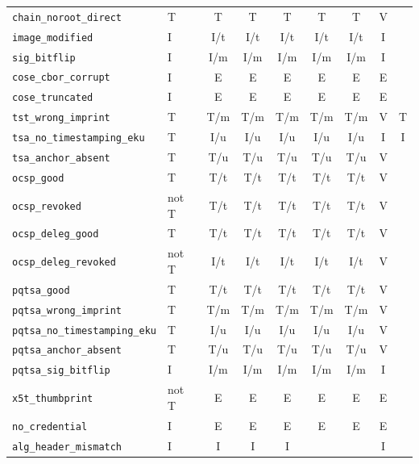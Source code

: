 {\begin{longtable}{>{\raggedright\arraybackslash}p{4.2cm}p{1.2cm}ccccccc}
\texttt{chain\_\allowbreak{}noroot\_\allowbreak{}direct} & T & T & T & T & T & T & V & \\
\texttt{image\_\allowbreak{}modified} & I & I/t & I/t & I/t & I/t & I/t & I & \\
\texttt{sig\_\allowbreak{}bitflip} & I & I/m & I/m & I/m & I/m & I/m & I & \\
\texttt{cose\_\allowbreak{}cbor\_\allowbreak{}corrupt} & I & E & E & E & E & E & E & \\
\texttt{cose\_\allowbreak{}truncated} & I & E & E & E & E & E & E & \\
\texttt{tst\_\allowbreak{}wrong\_\allowbreak{}imprint} & T & T/m & T/m & T/m & T/m & T/m & V & T\\
\texttt{tsa\_\allowbreak{}no\_\allowbreak{}timestamping\_\allowbreak{}eku} & T & I/u & I/u & I/u & I/u & I/u & I & I\\
\texttt{tsa\_\allowbreak{}anchor\_\allowbreak{}absent} & T & T/u & T/u & T/u & T/u & T/u & V & \\
\texttt{ocsp\_\allowbreak{}good} & T & T/t & T/t & T/t & T/t & T/t & V & \\
\texttt{ocsp\_\allowbreak{}revoked} & not T & T/t & T/t & T/t & T/t & T/t & V & \\
\texttt{ocsp\_\allowbreak{}deleg\_\allowbreak{}good} & T & T/t & T/t & T/t & T/t & T/t & V & \\
\texttt{ocsp\_\allowbreak{}deleg\_\allowbreak{}revoked} & not T & I/t & I/t & I/t & I/t & I/t & V & \\
\texttt{pqtsa\_\allowbreak{}good} & T & T/t & T/t & T/t & T/t & T/t & V & \\
\texttt{pqtsa\_\allowbreak{}wrong\_\allowbreak{}imprint} & T & T/m & T/m & T/m & T/m & T/m & V & \\
\texttt{pqtsa\_\allowbreak{}no\_\allowbreak{}timestamping\_\allowbreak{}eku} & T & I/u & I/u & I/u & I/u & I/u & V & \\
\texttt{pqtsa\_\allowbreak{}anchor\_\allowbreak{}absent} & T & T/u & T/u & T/u & T/u & T/u & V & \\
\texttt{pqtsa\_\allowbreak{}sig\_\allowbreak{}bitflip} & I & I/m & I/m & I/m & I/m & I/m & I & \\
\texttt{x5t\_\allowbreak{}thumbprint} & not T & E & E & E & E & E & E & \\
\texttt{no\_\allowbreak{}credential} & I & E & E & E & E & E & E & \\
\texttt{alg\_\allowbreak{}header\_\allowbreak{}mismatch} & I & I & I & I &  &  & I & \\

\end{longtable}}
